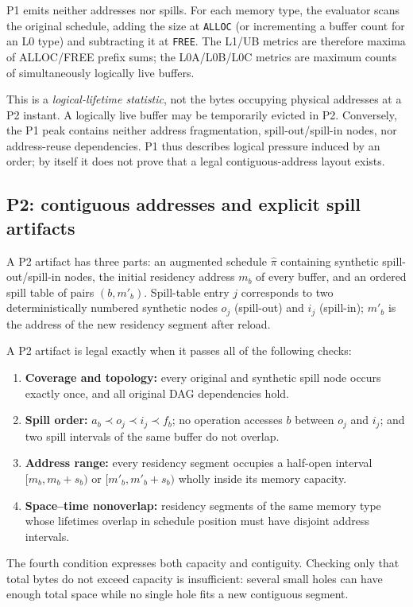 P1 emits neither addresses nor spills. For each memory type, the evaluator scans the original schedule, adding the size at \texttt{ALLOC} (or incrementing a buffer count for an L0 type) and subtracting it at \texttt{FREE}. The L1/UB metrics are therefore maxima of ALLOC/FREE prefix sums; the L0A/L0B/L0C metrics are maximum counts of simultaneously logically live buffers.

This is a \emph{logical-lifetime statistic}, not the bytes occupying physical addresses at a P2 instant. A logically live buffer may be temporarily evicted in P2. Conversely, the P1 peak contains neither address fragmentation, spill-out/spill-in nodes, nor address-reuse dependencies. P1 thus describes logical pressure induced by an order; by itself it does not prove that a legal contiguous-address layout exists.

\subsection{P2: contiguous addresses and explicit spill artifacts}

A P2 artifact has three parts: an augmented schedule $\widehat\pi$ containing synthetic spill-out/spill-in nodes, the initial residency address $m_b$ of every buffer, and an ordered spill table of pairs $(b,m'_b)$. Spill-table entry $j$ corresponds to two deterministically numbered synthetic nodes $o_j$ (spill-out) and $i_j$ (spill-in); $m'_b$ is the address of the new residency segment after reload.

A P2 artifact is legal exactly when it passes all of the following checks:
\begin{enumerate}
  \item \textbf{Coverage and topology:} every original and synthetic spill node occurs exactly once, and all original DAG dependencies hold.
  \item \textbf{Spill order:} $a_b\prec o_j\prec i_j\prec f_b$; no operation accesses $b$ between $o_j$ and $i_j$; and two spill intervals of the same buffer do not overlap.
  \item \textbf{Address range:} every residency segment occupies a half-open interval $[m_b,m_b+s_b)$ or $[m'_b,m'_b+s_b)$ wholly inside its memory capacity.
  \item \textbf{Space--time nonoverlap:} residency segments of the same memory type whose lifetimes overlap in schedule position must have disjoint address intervals.
\end{enumerate}
The fourth condition expresses both capacity and contiguity. Checking only that total bytes do not exceed capacity is insufficient: several small holes can have enough total space while no single hole fits a new contiguous segment.

